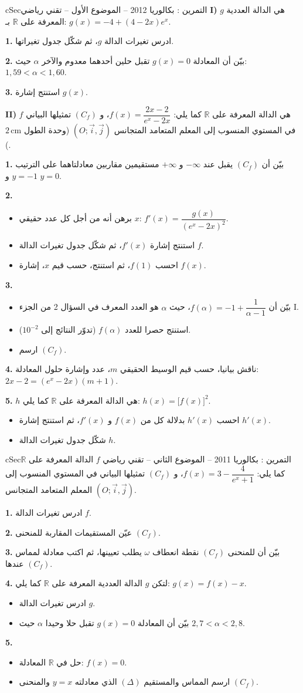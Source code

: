 \documentclass[12pt,a4paper]{article}
\newenvironment{BOX}[2]{\begin{otherlanguage}{english}\begin{arbox}{#1}{#2}}{\end{arbox}\end{otherlanguage}}
\newcounter{exo}
\newenvironment{tamrin}[1]{\stepcounter{exo}\begin{BOX}{cSec}{التمرين \theexo: #1}}{\end{BOX}}
\newcommand{\R}{\mathbb{R}}
\newenvironment{sq}{\begin{itemize}[leftmargin=2.4em,itemsep=3pt]}{\end{itemize}}
\newcommand{\qa}{\item[(أ)]}\newcommand{\qb}{\item[(ب)]}\newcommand{\qc}{\item[(جـ)]}\newcommand{\qd}{\item[(د)]}\newcommand{\qe}{\item[(هـ)]}
\newcommand{\QQ}[1]{\par\smallskip\textbf{#1.} }
\begin{document}
\begin{tamrin}{بكالوريا 2012 -- الموضوع الأول -- تقني رياضي}
\textbf{I)} $g$ هي الدالة العددية المعرفة على $\R$ بـ: $g(x)=-4+(4-2x)e^{x}$.
\QQ{1} ادرس تغيرات الدالة $g$، ثم شكّل جدول تغيراتها.
\QQ{2} بيّن أن المعادلة $g(x)=0$ تقبل حلين أحدهما معدوم والآخر $\alpha$ حيث: $1{,}59<\alpha<1{,}60$.
\QQ{3} استنتج إشارة $g(x)$.

\textbf{II)} $f$ هي الدالة المعرفة على $\R$ كما يلي: $f(x)=\dfrac{2x-2}{e^{x}-2x}$،
و $(C_f)$ تمثيلها البياني في المستوي المنسوب إلى المعلم المتعامد المتجانس $(O;\vec i,\vec j)$ (وحدة الطول $2\,\mathrm{cm}$).
\QQ{1} بيّن أن $(C_f)$ يقبل عند $-\infty$ و $+\infty$ مستقيمين مقاربين معادلتاهما على الترتيب $y=-1$ و $y=0$.
\QQ{2}
\begin{sq}
\qa برهن أنه من أجل كل عدد حقيقي $x$: $f'(x)=\dfrac{g(x)}{\left(e^{x}-2x\right)^2}$.
\qb استنتج إشارة $f'(x)$، ثم شكّل جدول تغيرات الدالة $f$.
\qc احسب $f(1)$، ثم استنتج، حسب قيم $x$، إشارة $f(x)$.
\end{sq}
\QQ{3}
\begin{sq}
\qa بيّن أن $f(\alpha)=-1+\dfrac{1}{\alpha-1}$، حيث $\alpha$ هو العدد المعرف في السؤال 2 من الجزء I.
\qb استنتج حصرا للعدد $f(\alpha)$ (تدوّر النتائج إلى $10^{-2}$).
\qc ارسم $(C_f)$.
\end{sq}
\QQ{4} ناقش بيانيا، حسب قيم الوسيط الحقيقي $m$، عدد وإشارة حلول المعادلة: $2x-2=\left(e^{x}-2x\right)(m+1)$.
\QQ{5} $h$ هي الدالة المعرفة على $\R$ كما يلي: $h(x)=\big[f(x)\big]^2$.
\begin{sq}
\qa احسب $h'(x)$ بدلالة كل من $f(x)$ و $f'(x)$، ثم استنتج إشارة $h'(x)$.
\qb شكّل جدول تغيرات الدالة $h$.
\end{sq}
\end{tamrin}

\begin{tamrin}{بكالوريا 2011 -- الموضوع الثاني -- تقني رياضي}
$f$ الدالة المعرفة على $\R$ كما يلي: $f(x)=3-\dfrac{4}{e^{x}+1}$،
و $(C_f)$ تمثيلها البياني في المستوي المنسوب إلى المعلم المتعامد المتجانس $(O;\vec i,\vec j)$.
\QQ{1} ادرس تغيرات الدالة $f$.
\QQ{2} عيّن المستقيمات المقاربة للمنحنى $(C_f)$.
\QQ{3} بيّن أن للمنحنى $(C_f)$ نقطة انعطاف $\omega$ يطلب تعيينها، ثم اكتب معادلة لمماس $(C_f)$ عندها.
\QQ{4} لتكن $g$ الدالة العددية المعرفة على $\R$ كما يلي: $g(x)=f(x)-x$.
\begin{sq}
\qa ادرس تغيرات الدالة $g$.
\qb بيّن أن المعادلة $g(x)=0$ تقبل حلا وحيدا $\alpha$ حيث $2{,}7<\alpha<2{,}8$.
\end{sq}
\QQ{5}
\begin{sq}
\qa حل في $\R$ المعادلة: $f(x)=0$.
\qb ارسم المماس والمستقيم $(\Delta)$ الذي معادلته $y=x$ والمنحنى $(C_f)$.
\end{sq}
\end{tamrin}
\end{document}

